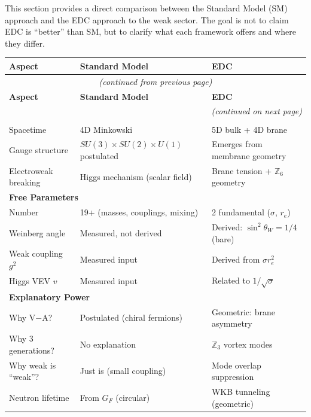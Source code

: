 \documentclass[11pt,a4paper]{book}
\theoremstyle{definition}
\theoremstyle{remark}
\begin{document}
This section provides a direct comparison between the Standard Model (SM) approach
and the EDC approach to the weak sector. The goal is not to claim EDC is ``better''
than SM, but to clarify what each framework offers and where they differ.

\begin{center}
\begin{longtable}{p{4cm}p{5cm}p{5cm}}
\toprule
\textbf{Aspect} & \textbf{Standard Model} & \textbf{EDC} \\
\midrule
\endfirsthead
\multicolumn{3}{c}{{\textit{(continued from previous page)}}} \\
\toprule
\textbf{Aspect} & \textbf{Standard Model} & \textbf{EDC} \\
\midrule
\endhead
\midrule
\multicolumn{3}{r}{{\textit{(continued on next page)}}} \\
\endfoot
\bottomrule
\endlastfoot

\multicolumn{3}{l}{\textbf{Foundational Assumptions}} \\
\midrule
Spacetime & 4D Minkowski & 5D bulk + 4D brane \\
Gauge structure & $SU(3) \times SU(2) \times U(1)$ postulated & Emerges from membrane geometry \\
Electroweak breaking & Higgs mechanism (scalar field) & Brane tension + $\mathbb{Z}_6$ geometry \\
\midrule

\multicolumn{3}{l}{\textbf{Free Parameters}} \\
\midrule
Number & 19+ (masses, couplings, mixing) & 2 fundamental ($\sigma$, $r_e$) \\
Weinberg angle & Measured, not derived & Derived: $\sin^2\theta_W = 1/4$ (bare) \\
Weak coupling $g^2$ & Measured input & Derived from $\sigma r_e^2$ \\
Higgs VEV $v$ & Measured input & Related to $1/\sqrt{\sigma}$ \\
\midrule

\multicolumn{3}{l}{\textbf{Explanatory Power}} \\
\midrule
Why V$-$A? & Postulated (chiral fermions) & Geometric: brane asymmetry \\
Why 3 generations? & No explanation & $\mathbb{Z}_3$ vortex modes \\
Why weak is ``weak''? & Just is (small coupling) & Mode overlap suppression \\
Neutron lifetime & From $G_F$ (circular) & WKB tunneling (geometric) \\
\midrule


\end{longtable}
\end{center}
\end{document}
